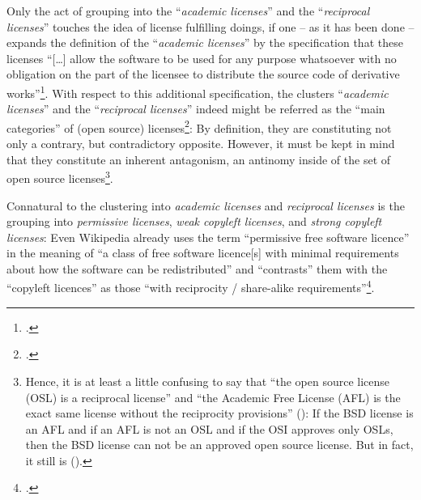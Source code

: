 Only the act of grouping into the \enquote{\emph{academic licenses}} and the
\enquote{\emph{reciprocal licenses}} touches the idea of license fulfilling
doings, if one -- as it has been done -- expands the definition of the
\enquote{\emph{academic licenses}} by the specification that these licenses
\enquote{[\ldots] allow the software to be used for any purpose whatsoever with
no obligation on the part of the licensee to distribute the source code of
derivative works}\footcite[cf.][71]{Rosen2005a}. With respect to this additional
specification, the clusters \enquote{\emph{academic licenses}} and the
\enquote{\emph{reciprocal licenses}} indeed might be referred as the
\enquote{main categories} of (open source)
licenses\footcite[cf.][179]{Rosen2005a}: By definition, they are constituting
not only a contrary, but contradictory opposite. However, it must  be kept in
mind that they constitute an inherent antagonism, an antinomy inside of the set
of open source licenses\footnote{Hence, it is at least a little confusing to say
that \enquote{the open source license (OSL) is a reciprocal license} and
\enquote{the Academic Free License (AFL) is the exact same license without the
reciprocity provisions} (\cite[cf.][180]{Rosen2005a}): If the BSD license is an
AFL and if an AFL is not an OSL and if the OSI approves only OSLs, then the BSD
license can not be an approved open source license. But in fact, it still is
(\cite[cf.][\nopage wp]{OSI2012b}).}.

Connatural to the clustering into \emph{academic licenses} and \emph{reciprocal
licenses} is the grouping into \emph{permissive licenses}, \emph{weak copyleft
licenses}, and \emph{strong copyleft licenses}: Even Wikipedia already uses the
term \enquote{permissive free software licence} in the meaning of \enquote{a
class of free software licence[s] with minimal requirements about how the
software can be redistributed} and \enquote{contrasts} them with the
\enquote{copyleft licences} as those \enquote{with reciprocity / share-alike
requirements}\footcite[cf.][\nopage wp]{wpPermLic2013a}. 

